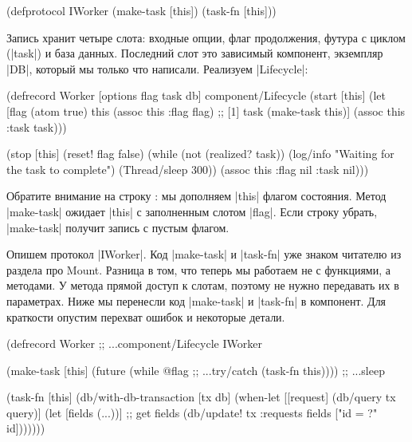 \begin{english}
  \begin{clojure}
(defprotocol IWorker
  (make-task [this])
  (task-fn [this]))
  \end{clojure}
\end{english}

Запись хранит четыре слота: входные опции, флаг продолжения, футура с циклом
(\spverb|task|) и база данных. Последний слот это зависимый компонент, экземпляр
\spverb|DB|, который мы только что написали. Реализуем \spverb|Lifecycle|:

\begin{english}
  \begin{clojure}
(defrecord Worker
  [options flag task db]
  component/Lifecycle
  (start [this]
    (let [flag (atom true)
          this (assoc this :flag flag) ;; [1]
          task (make-task this)]
      (assoc this :task task)))

  (stop [this]
    (reset! flag false)
    (while (not (realized? task))
      (log/info "Waiting for the task to complete")
      (Thread/sleep 300))
    (assoc this :flag nil :task nil)))
  \end{clojure}
\end{english}

Обратите внимание на строку : мы дополняем \spverb|this| флагом
состояния. Метод \spverb|make-task| ожидает \spverb|this| с заполненным слотом
\spverb|flag|. Если строку убрать, \spverb|make-task| получит запись с пустым
флагом.

Опишем протокол \spverb|IWorker|. Код \spverb|make-task| и \spverb|task-fn| уже
знаком читателю из раздела про Mount. Разница в том, что теперь мы работаем не с
функциями, а методами. У метода прямой доступ к слотам, поэтому не нужно
передавать их в параметрах. Ниже мы перенесли код \spverb|make-task| и
\spverb|task-fn| в компонент. Для краткости опустим перехват ошибок и некоторые
детали.

\begin{english}
  \begin{clojure}
(defrecord Worker
  ;; ...component/Lifecycle
  IWorker

  (make-task [this]
    (future
      (while @flag        ;; ...try/catch
        (task-fn this)))) ;; ...sleep

  (task-fn [this]
    (db/with-db-transaction [tx db]
      (when-let [[request] (db/query tx query)]
        (let [fields (...))] ;; get fields
          (db/update! tx :requests
                      fields ["id = ?" id]))))))
  \end{clojure}
\end{english}

